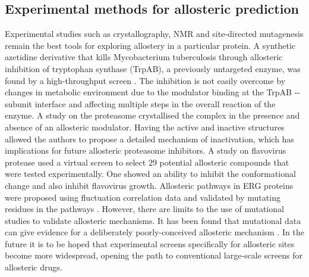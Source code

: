 \subsection{Experimental methods for allosteric prediction}

Experimental studies such as crystallography, NMR and site-directed mutagenesis remain the best tools for exploring allostery in a particular protein.
A synthetic azetidine derivative that kills Mycobacterium tuberculosis through allosteric inhibition of tryptophan synthase (TrpAB), a previously untargeted enzyme, was found by a high-throughput screen \cite{Wellington2017}.
The inhibition is not easily overcome by changes in metabolic environment due to the modulator binding at the TrpAB \textalpha -\textbeta -subunit interface and affecting multiple steps in the overall reaction of the enzyme.
A study on the proteasome \cite{Haselbach2017} crystallised the complex in the presence and absence of an allosteric modulator.
Having the active and inactive structures allowed the authors to propose a detailed mechanism of inactivation, which has implications for future allosteric proteasome inhibitors.
A study on flavovirus protease \cite{Brecher2017} used a virtual screen to select 29 potential allosteric compounds that were tested experimentally.
One showed an ability to inhibit the conformational change and also inhibit flavovirus growth.
Allosteric pathways in ERG proteins were proposed using fluctuation correlation data and validated by mutating residues in the pathways \cite{Ye2017}.
However, there are limits to the use of mutational studies to validate allosteric mechanisms.
It has been found that mutational data can give evidence for a deliberately poorly-conceived allosteric mechanism \cite{Tang2017}.
In the future it is to be hoped that experimental screens specifically for allosteric sites \cite{Martin2012, Jayakar2017, Pellerano2017, Pisco2017, Raman2014} become more widespread, opening the path to conventional large-scale screens for allosteric drugs.


